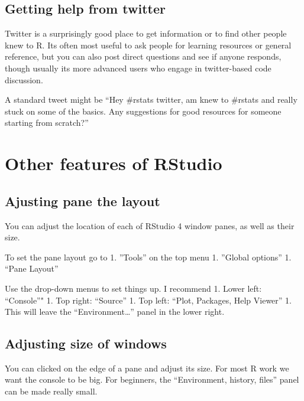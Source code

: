 \documentclass[
]{book}
\begin{document}
\hypertarget{getting-help-from-twitter}{%
\subsection{Getting help from twitter}\label{getting-help-from-twitter}}

Twitter is a surprisingly good place to get information or to find other people knew to R. Its often most useful to ask people for learning resources or general reference, but you can also post direct questions and see if anyone responds, though usually its more advanced users who engage in twitter-based code discussion.

A standard tweet might be
``Hey \#rstats twitter, am knew to \#rstats and really stuck on some of the basics. Any suggestions for good resources for someone starting from scratch?''

\hypertarget{other-features-of-rstudio}{%
\section{Other features of RStudio}\label{other-features-of-rstudio}}

\hypertarget{ajusting-pane-the-layout}{%
\subsection{Ajusting pane the layout}\label{ajusting-pane-the-layout}}

You can adjust the location of each of RStudio 4 window panes, as well as their size.

To set the pane layout go to
1. ''Tools'' on the top menu
1. ''Global options''
1. ``Pane Layout''

Use the drop-down menus to set things up. I recommend
1. Lower left: ``Console''"
1. Top right: ``Source''
1. Top left: ``Plot, Packages, Help Viewer''
1. This will leave the ``Environment\ldots{}'' panel in the lower right.

\hypertarget{adjusting-size-of-windows}{%
\subsection{Adjusting size of windows}\label{adjusting-size-of-windows}}

You can clicked on the edge of a pane and adjust its size. For most R work we want the console to be big. For beginners, the ``Environment, history, files'' panel can be made really small.
\end{document}
